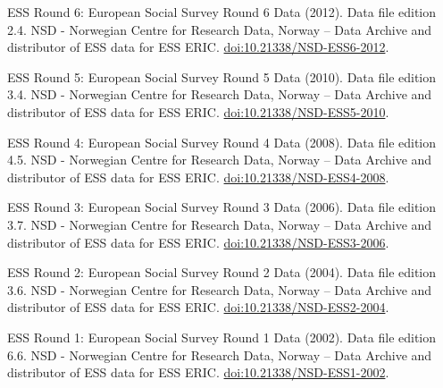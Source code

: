 ESS Round 6: European Social Survey Round 6 Data (2012). Data file
edition 2.4. NSD - Norwegian Centre for Research Data, Norway -- Data
Archive and distributor of ESS data for ESS ERIC.
\url{doi:10.21338/NSD-ESS6-2012}.

ESS Round 5: European Social Survey Round 5 Data (2010). Data file
edition 3.4. NSD - Norwegian Centre for Research Data, Norway -- Data
Archive and distributor of ESS data for ESS ERIC.
\url{doi:10.21338/NSD-ESS5-2010}.

ESS Round 4: European Social Survey Round 4 Data (2008). Data file
edition 4.5. NSD - Norwegian Centre for Research Data, Norway -- Data
Archive and distributor of ESS data for ESS ERIC.
\url{doi:10.21338/NSD-ESS4-2008}.

ESS Round 3: European Social Survey Round 3 Data (2006). Data file
edition 3.7. NSD - Norwegian Centre for Research Data, Norway -- Data
Archive and distributor of ESS data for ESS ERIC.
\url{doi:10.21338/NSD-ESS3-2006}.

ESS Round 2: European Social Survey Round 2 Data (2004). Data file
edition 3.6. NSD - Norwegian Centre for Research Data, Norway -- Data
Archive and distributor of ESS data for ESS ERIC.
\url{doi:10.21338/NSD-ESS2-2004}.

ESS Round 1: European Social Survey Round 1 Data (2002). Data file
edition 6.6. NSD - Norwegian Centre for Research Data, Norway -- Data
Archive and distributor of ESS data for ESS ERIC.
\url{doi:10.21338/NSD-ESS1-2002}.



\address{%
Ann Wozniak AIA, NCARB, LEED AP BD+C, NCIDQ\\
Boise State University, Ecology, Evolution, and Behavior\\%
1910 W. University Drive\\ Boise, ID, 83725\\
%
\url{https://journal.r-project.org}%
\\\textit{ORCiD: \href{https://orcid.org/0000-0002-2655-7283}{0000-0002-2655-7283}}%
\\\href{mailto:annwozniak@boisestate.edu}{\nolinkurl{annwozniak@boisestate.edu}}
}
